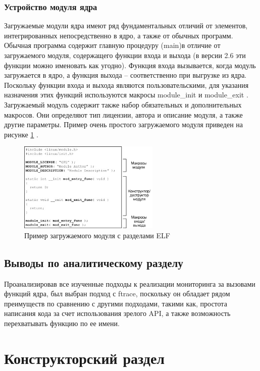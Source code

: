 \documentclass[a4paper,14pt]{extarticle}
\begin{document}
 	\subsubsection{Устройство модуля ядра}
 	Загружаемые модули ядра имеют ряд фундаментальных отличий от элементов, интегрированных непосредственно в ядро, а также от обычных программ. Обычная программа содержит главную процедуру (main)в отличие от загружаемого модуля, содержащего функции входа и выхода (в версии 2.6 эти функции можно именовать как угодно). Функция входа вызывается, когда модуль загружается в ядро, а функция выхода – соответственно при выгрузке из ядра. Поскольку функции входа и выхода являются пользовательскими, для указания назначения этих функций используются макросы module\_init и module\_exit . Загружаемый модуль содержит также набор обязательных и дополнительных макросов. Они определяют тип лицензии, автора и описание модуля, а также другие параметры. Пример очень простого загружаемого модуля приведен на рисунке  \ref{fig:an01} .
 	\begin{figure}[h!]
 		\centering
 		\includegraphics[width=0.6\textwidth]{img/1.png}
 		\caption{Пример загружаемого модуля с разделами ELF}
 		\label{fig:an01}
 	\end{figure}
 
 \subsection*{Выводы по аналитическому разделу}
 
 Проанализировав все изученные подходы к реализации мониторинга за вызовами функций ядра, был выбран подход с ftrace, поскольку он обладает рядом преимуществ по сравнению с другими подходами, такими как, простота написания кода за счет использования зрелого API, а также возможность перехватывать функцию по ее имени.
 
 \newpage
 
 \section{Конструкторский раздел}
 
\end{document}
